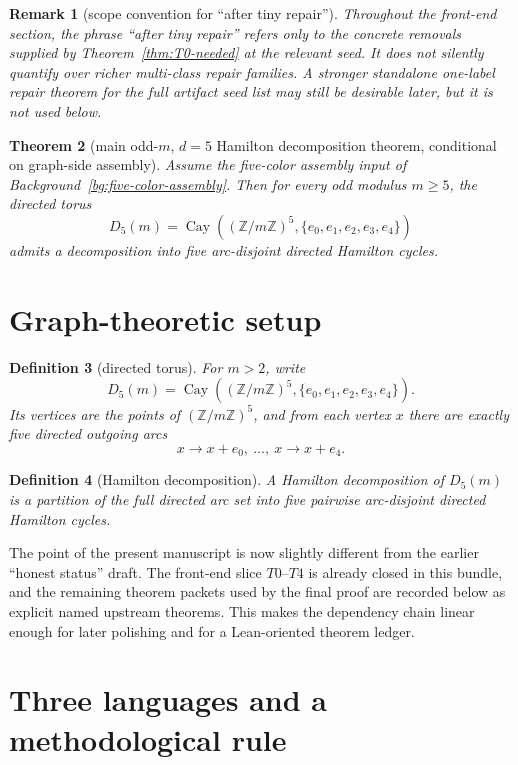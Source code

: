 \documentclass[11pt]{article}
\newtheorem{theorem}{Theorem}[section]
\newtheorem{remark}[theorem]{Remark}
\newtheorem{definition}[theorem]{Definition}
\newcommand{\Z}{\mathbb Z}
\begin{document}
\begin{remark}[scope convention for ``after tiny repair'']
Throughout the front-end section, the phrase ``after tiny repair'' refers only
to the concrete removals supplied by Theorem~\ref{thm:T0-needed} at the relevant
seed.  It does not silently quantify over richer multi-class repair families.
A stronger standalone one-label repair theorem for the full artifact seed list
may still be desirable later, but it is not used below.
\end{remark}

\begin{theorem}[main odd-$m$, $d=5$ Hamilton decomposition theorem, conditional on graph-side assembly]
\label{thm:conditional-full}
Assume the five-color assembly input of
Background~\ref{bg:five-color-assembly}.
Then for every odd modulus $m\ge 5$, the directed torus
\[
D_5(m)=\operatorname{Cay}((\Z/m\Z)^5,\{e_0,e_1,e_2,e_3,e_4\})
\]
admits a decomposition into five arc-disjoint directed Hamilton cycles.
\end{theorem}

\section{Graph-theoretic setup}

\begin{definition}[directed torus]
For \(m>2\), write
\[
D_5(m)=\operatorname{Cay}((\Z/m\Z)^5,\{e_0,e_1,e_2,e_3,e_4\}).
\]
Its vertices are the points of \((\Z/m\Z)^5\), and from each vertex \(x\) there
are exactly five directed outgoing arcs
\[
x\to x+e_0,\ \dots,\ x\to x+e_4.
\]
\end{definition}

\begin{definition}[Hamilton decomposition]
A \emph{Hamilton decomposition} of \(D_5(m)\) is a partition of the full
directed arc set into five pairwise arc-disjoint directed Hamilton cycles.
\end{definition}

The point of the present manuscript is now slightly different from the earlier
``honest status'' draft.
The front-end slice $T0$--$T4$ is already
closed in this bundle, and the remaining theorem packets used by the final
proof are recorded below as explicit named upstream theorems.
This makes the dependency chain linear enough for later polishing and for a
Lean-oriented theorem ledger.

\section{Three languages and a methodological rule}
\end{document}

